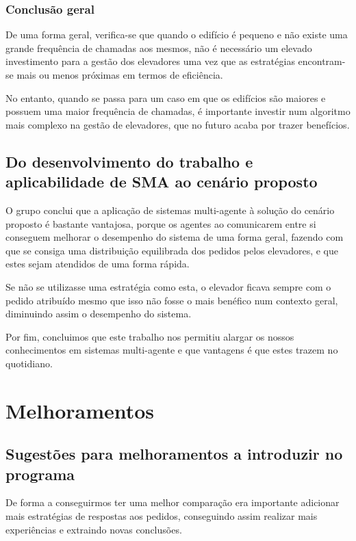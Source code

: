 \documentclass[a4paper]{article}
\begin{document}
\subsubsection{Conclusão geral}

De uma forma geral, verifica-se que quando o edifício é pequeno e não existe uma grande frequência de chamadas aos mesmos, não é necessário um elevado investimento para a gestão dos elevadores uma vez que as estratégias encontram-se mais ou menos próximas em termos de eficiência.

No entanto, quando se passa para um caso em que os edifícios são maiores e possuem uma maior frequência de chamadas, é importante investir num algoritmo mais complexo na gestão de elevadores, que no futuro acaba por trazer benefícios.

\subsection{Do desenvolvimento do trabalho e aplicabilidade de SMA ao cenário proposto}

O grupo conclui que a aplicação de sistemas multi-agente à solução do cenário proposto é bastante vantajosa, porque os agentes ao comunicarem entre si conseguem melhorar o desempenho do sistema de uma forma geral, fazendo com que se consiga uma distribuição equilibrada dos pedidos pelos elevadores, e que estes sejam atendidos de uma forma rápida.

Se não se utilizasse uma estratégia como esta, o elevador ficava sempre com o pedido atribuído mesmo que isso não fosse o mais benéfico num contexto geral, diminuindo assim o desempenho do sistema. 

Por fim, concluimos que este trabalho nos permitiu alargar os nossos conhecimentos em sistemas multi-agente e que vantagens é que estes trazem no quotidiano.

\newpage

\section{Melhoramentos}

\subsection{Sugestões para melhoramentos a introduzir no programa}

De forma a conseguirmos ter uma melhor comparação era importante adicionar mais estratégias de respostas aos pedidos, conseguindo assim realizar mais experiências e extraindo novas conclusões.
\end{document}
